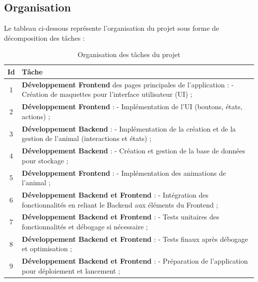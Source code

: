 \documentclass{conception_detaillee}
\begin{document}
\begin{itemize}[label=\textbullet]
\section{Organisation}
Le tableau ci-dessous représente l’organisation du projet sous forme de
décomposition des tâches :
\begin{table}[h]
    \centering
    \renewcommand{\arraystretch}{1.3}
    \begin{tabular}{|c|p{12cm}|}
        \hline
        \textbf{Id} & \textbf{Tâche} \\
        \hline
        1 & \textbf{Développement Frontend} des pages principales de l’application : \newline 
        - Création de maquettes pour l’interface utilisateur (UI) ; \\
        \hline
        2 & \textbf{Développement Frontend} : \newline
        - Implémentation de l’UI (boutons, états, actions) ; \\
        \hline
        3 & \textbf{Développement Backend} : \newline
        - Implémentation de la création et de la gestion de l’animal (interactions et états) ; \\
        \hline
        4 & \textbf{Développement Backend} : \newline
        - Création et gestion de la base de données pour stockage ; \\
        \hline
        5 & \textbf{Développement Frontend} : \newline
        - Implémentation des animations de l’animal ; \\
        \hline
        6 & \textbf{Développement Backend et Frontend} : \newline
        - Intégration des fonctionnalités en reliant le Backend aux éléments du Frontend ; \\
        \hline
        7 & \textbf{Développement Backend et Frontend} : \newline
        - Tests unitaires des fonctionnalités et débogage si nécessaire ; \\
        \hline
        8 & \textbf{Développement Backend et Frontend} : \newline
        - Tests finaux après débogage et optimisation ; \\
        \hline
        9 & \textbf{Développement Backend et Frontend} : \newline
        - Préparation de l’application pour déploiement et lancement ; \\
        \hline
    \end{tabular}
    \caption{Organisation des tâches du projet}
    \label{tab:organisation}
\end{table}

\end{itemize}
\end{document}
